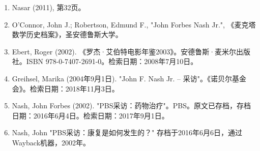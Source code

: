 \begin{enumerate}
\item Nasar (2011), 第32页。
\item O'Connor, John J.; Robertson, Edmund F., "John Forbes Nash Jr.", 《麦克塔数学历史档案》，圣安德鲁斯大学。
\item Ebert, Roger (2002). 《罗杰·艾伯特电影年鉴2003》。安德鲁斯·麦米尔出版社。ISBN 978-0-7407-2691-0。检索日期：2008年7月10日。
\item Greihsel, Marika (2004年9月1日). "John F. Nash Jr. – 采访"。《诺贝尔基金会》。检索日期：2018年11月3日。
\item Nash, John Forbes (2002). "PBS采访：药物治疗"。PBS。原文已存档，存档日期：2016年6月4日。检索日期：2017年9月1日。
\item Nash, John "PBS采访：康复是如何发生的？" 存档于2016年6月6日，通过Wayback机器，2002年。
\end{enumerate}